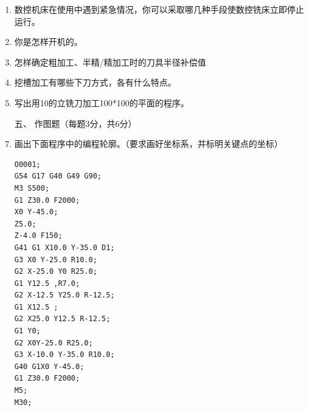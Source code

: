 \documentclass[12pt,twocolumn,landscape,UTF8,twoside]{ctexart}
\begin{document}
\begin{spacing}{1.3}
\begin{enumerate} [1、]
\item 数控机床在使用中遇到紧急情况，你可以采取哪几种手段使数控铣床立即停止运行。
\item 你是怎样开机的。
\item 怎样确定粗加工、半精/精加工时的刀具半径补偿值
\item 挖槽加工有哪些下刀方式，各有什么特点。
\item 写出用\diameter 10的立铣刀加工100*100的平面的程序。

\item[\heiti 五、] {\heiti 作图题（每题3分，共6分）}

\item 画出下面程序中的编程轮廓。（要求画好坐标系，并标明关键点的坐标）
\begin{verbatim}
O0001;
G54 G17 G40 G49 G90;
M3 S500;
G1 Z30.0 F2000;
X0 Y-45.0;
Z5.0;
Z-4.0 F150;
G41 G1 X10.0 Y-35.0 D1;
G3 X0 Y-25.0 R10.0;
G2 X-25.0 Y0 R25.0;
G1 Y12.5 ,R7.0;
G2 X-12.5 Y25.0 R-12.5;
G1 X12.5 ;
G2 X25.0 Y12.5 R-12.5;
G1 Y0;
G2 X0Y-25.0 R25.0;
G3 X-10.0 Y-35.0 R10.0;
G40 G1X0 Y-45.0;
G1 Z30.0 F2000;
M5;
M30;
\end{verbatim}


\end{enumerate}
\end{spacing}
\end{document}
